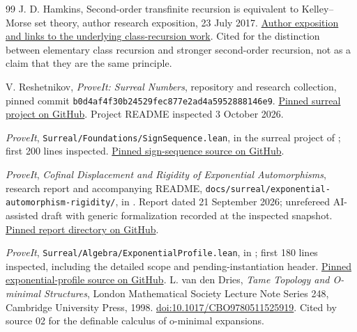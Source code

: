 \documentclass[11pt,a4paper]{article}
\numberwithin{equation}{section}
\theoremstyle{plain}
\theoremstyle{definition}
\theoremstyle{remark}
\newcommand{\code}[1]{\texttt{\small #1}}
\begin{document}
\begin{thebibliography}{99}
J. D. Hamkins, Second-order transfinite recursion is equivalent to
Kelley--Morse set theory, author research exposition, 23 July 2017.
\href{https://jdh.hamkins.org/second-order-transfinite-recursion-is-equivalent-to-kelley-morse-set-theory/}{Author exposition and links to the underlying class-recursion work}.
Cited for the distinction between elementary class recursion and stronger
second-order recursion, not as a claim that they are the same principle.

V. Reshetnikov, \emph{ProveIt: Surreal Numbers}, repository and research
collection, pinned commit
\code{b0d4af4f30b24529fec877e2ad4a5952888146e9}.
\href{https://github.com/VladimirReshetnikov/ProveIt/tree/b0d4af4f30b24529fec877e2ad4a5952888146e9/Algebra/SurrealNumbers}{Pinned surreal project on GitHub}.
Project README inspected 3 October 2026.

\emph{ProveIt}, \code{Surreal/Foundations/SignSequence.lean}, in the
surreal project of \cite{RepoMain}; first 200 lines inspected.
\href{https://github.com/VladimirReshetnikov/ProveIt/blob/b0d4af4f30b24529fec877e2ad4a5952888146e9/Algebra/SurrealNumbers/Surreal/Foundations/SignSequence.lean}{Pinned sign-sequence source on GitHub}.

\emph{ProveIt}, \emph{Cofinal Displacement and Rigidity of Exponential
Automorphisms}, research report and accompanying README,
\code{docs/surreal/exponential-automorphism-rigidity/}, in \cite{RepoMain}.
Report dated 21 September 2026; unrefereed AI-assisted draft with generic
formalization recorded at the inspected snapshot.
\href{https://github.com/VladimirReshetnikov/ProveIt/tree/b0d4af4f30b24529fec877e2ad4a5952888146e9/Algebra/SurrealNumbers/docs/surreal/exponential-automorphism-rigidity}{Pinned report directory on GitHub}.

\emph{ProveIt}, \code{Surreal/Algebra/ExponentialProfile.lean}, in
\cite{RepoMain}; first 180 lines inspected, including the detailed scope
and pending-instantiation header.
\href{https://github.com/VladimirReshetnikov/ProveIt/blob/b0d4af4f30b24529fec877e2ad4a5952888146e9/Algebra/SurrealNumbers/Surreal/Algebra/ExponentialProfile.lean}{Pinned exponential-profile source on GitHub}.
L. van den Dries, \emph{Tame Topology and O-minimal Structures},
London Mathematical Society Lecture Note Series 248,
Cambridge University Press, 1998.
\href{https://doi.org/10.1017/CBO9780511525919}{doi:10.1017/CBO9780511525919}.
Cited by source 02 for the definable calculus of o-minimal expansions.


\end{thebibliography}
\end{document}
